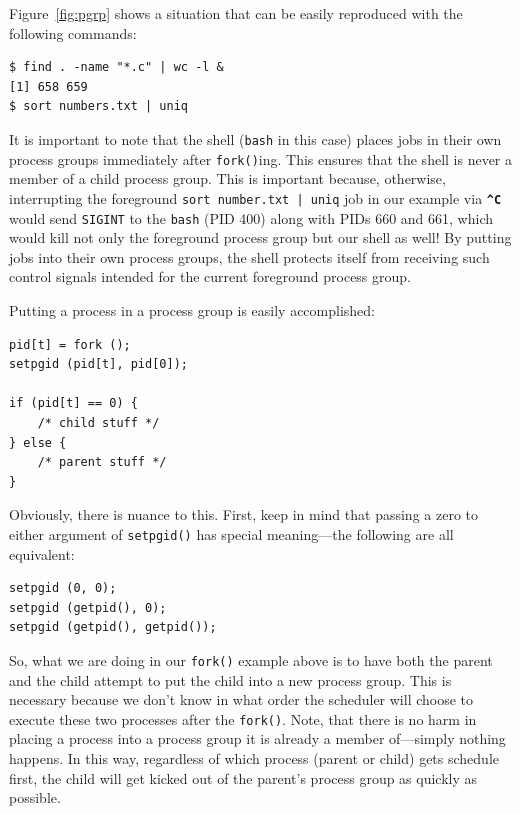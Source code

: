 \documentclass[10pt]{article}
\newcommand{\ctrl}[1]{\texttt{\textbf{\string^#1}}}
\begin{document}
Figure~\ref{fig:pgrp} shows a situation that can be easily reproduced
with the following commands:

\begin{verbatim}
$ find . -name "*.c" | wc -l &
[1] 658 659
$ sort numbers.txt | uniq
\end{verbatim}

It is important to note that the shell (\texttt{bash} in this case)
places jobs in their own process groups immediately after
\texttt{fork()}ing.  This ensures that the shell is never a member of a
child process group.  This is important because, otherwise, interrupting
the foreground \texttt{sort number.txt | uniq} job in our example via
\ctrl{C} would send \texttt{SIGINT} to the \texttt{bash} (PID 400) along
with PIDs 660 and 661, which would kill not only the foreground process
group but our shell as well!  By putting jobs into their own process
groups, the shell protects itself from receiving such control signals
intended for the current foreground process group.

\pagebreak

Putting a process in a process group is easily accomplished:

\begin{verbatim}
pid[t] = fork ();
setpgid (pid[t], pid[0]);

if (pid[t] == 0) {
    /* child stuff */
} else {
    /* parent stuff */
}
\end{verbatim}

Obviously, there is nuance to this.  First, keep in mind that passing a
zero to either argument of \texttt{setpgid()} has special meaning---the
following are all equivalent:

\begin{verbatim}
setpgid (0, 0);
setpgid (getpid(), 0);
setpgid (getpid(), getpid());
\end{verbatim}

So, what we are doing in our \texttt{fork()} example above is to have
both the parent and the child attempt to put the child into a new
process group.  This is necessary because we don't know in what order
the scheduler will choose to execute these two processes after the
\texttt{fork()}.  Note, that there is no harm in placing a process into
a process group it is already a member of---simply nothing happens.  In
this way, regardless of which process (parent or child) gets schedule
first, the child will get kicked out of the parent's process group as
quickly as possible.
\end{document}

